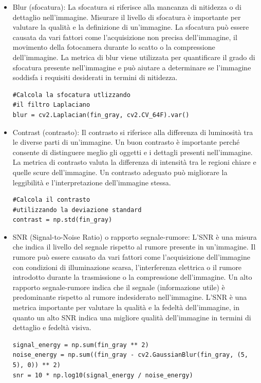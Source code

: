 \documentclass[a4paper,12pt]{report}
\begin{document}
    \begin{itemize}
      \item Blur (sfocatura): La sfocatura si riferisce alla mancanza di nitidezza o di dettaglio nell'immagine. Misurare il livello di sfocatura è importante per valutare la qualità e la definizione di un'immagine. La sfocatura può essere causata da vari fattori come l'acquisizione non precisa dell'immagine, il movimento della fotocamera durante lo scatto o la compressione dell'immagine. La metrica di blur viene utilizzata per quantificare il grado di sfocatura presente nell'immagine e può aiutare a determinare se l'immagine soddisfa i requisiti desiderati in termini di nitidezza.
      \begin{lstlisting}
#Calcola la sfocatura utlizzando
#il filtro Laplaciano
blur = cv2.Laplacian(fin_gray, cv2.CV_64F).var()
      \end{lstlisting}
   
      \newpage
      \item Contrast (contrasto): Il contrasto si riferisce alla differenza di luminosità tra le diverse parti di un'immagine. Un buon contrasto è importante perché consente di distinguere meglio gli oggetti e i dettagli presenti nell'immagine. La metrica di contrasto valuta la differenza di intensità tra le regioni chiare e quelle scure dell'immagine. Un contrasto adeguato può migliorare la leggibilità e l'interpretazione dell'immagine stessa.
      \begin{lstlisting}
#Calcola il contrasto 
#utilizzando la deviazione standard
contrast = np.std(fin_gray)
      \end{lstlisting}
      \item SNR (Signal-to-Noise Ratio) o rapporto segnale-rumore: L'SNR è una misura che indica il livello del segnale rispetto al rumore presente in un'immagine. Il rumore può essere causato da vari fattori come l'acquisizione dell'immagine con condizioni di illuminazione scarsa, l'interferenza elettrica o il rumore introdotto durante la trasmissione o la compressione dell'immagine. Un alto rapporto segnale-rumore indica che il segnale (informazione utile) è predominante rispetto al rumore indesiderato nell'immagine. L'SNR è una metrica importante per valutare la qualità e la fedeltà dell'immagine, in quanto un alto SNR indica una migliore qualità dell'immagine in termini di dettaglio e fedeltà visiva.
      \begin{lstlisting}
signal_energy = np.sum(fin_gray ** 2)
noise_energy = np.sum((fin_gray - cv2.GaussianBlur(fin_gray, (5, 5), 0)) ** 2)
snr = 10 * np.log10(signal_energy / noise_energy)
      \end{lstlisting}
    \end{itemize}
\end{document}
